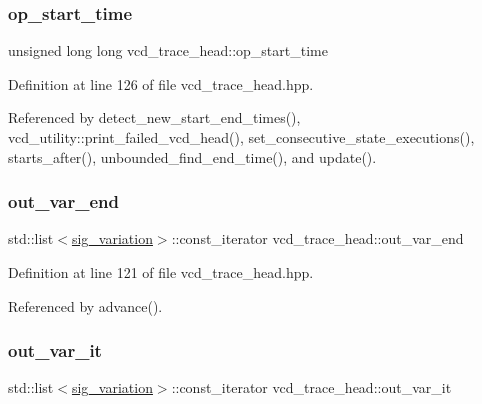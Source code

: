 \subsubsection{\texorpdfstring{op\+\_\+start\+\_\+time}{op\_start\_time}}
{\footnotesize\ttfamily unsigned long long vcd\+\_\+trace\+\_\+head\+::op\+\_\+start\+\_\+time}



Definition at line 126 of file vcd\+\_\+trace\+\_\+head.\+hpp.



Referenced by detect\+\_\+new\+\_\+start\+\_\+end\+\_\+times(), vcd\+\_\+utility\+::print\+\_\+failed\+\_\+vcd\+\_\+head(), set\+\_\+consecutive\+\_\+state\+\_\+executions(), starts\+\_\+after(), unbounded\+\_\+find\+\_\+end\+\_\+time(), and update().

\mbox{\label{structvcd__trace__head_a9f295da972306c34afa09c14338cab9b}} 
\subsubsection{\texorpdfstring{out\+\_\+var\+\_\+end}{out\_var\_end}}
{\footnotesize\ttfamily std\+::list$<$\hyperlink{structsig__variation}{sig\+\_\+variation}$>$\+::const\+\_\+iterator vcd\+\_\+trace\+\_\+head\+::out\+\_\+var\+\_\+end}



Definition at line 121 of file vcd\+\_\+trace\+\_\+head.\+hpp.



Referenced by advance().

\mbox{\label{structvcd__trace__head_a8d81fbe60f9ec091baeeb08d810556a8}} 
\subsubsection{\texorpdfstring{out\+\_\+var\+\_\+it}{out\_var\_it}}
{\footnotesize\ttfamily std\+::list$<$\hyperlink{structsig__variation}{sig\+\_\+variation}$>$\+::const\+\_\+iterator vcd\+\_\+trace\+\_\+head\+::out\+\_\+var\+\_\+it}



